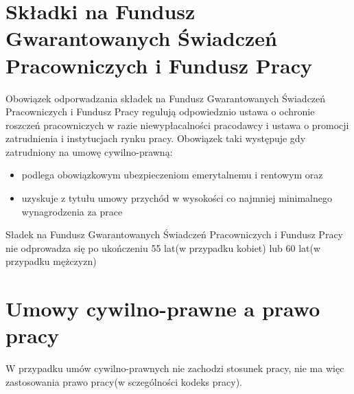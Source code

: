 
\section{Składki na Fundusz Gwarantowanych Świadczeń Pracowniczych i Fundusz Pracy}
Obowiązek odporwadzania składek na Fundusz Gwarantowanych Świadczeń Pracowniczych i Fundusz Pracy regulują odpowiedznio ustawa o ochronie roszczeń pracowniczych w razie niewypłacalności pracodawcy\cite{TODO} i ustawa o promocji zatrudnienia i instytucjach rynku pracy. Obowiązek taki występuje gdy zatrudniony na umowę cywilno-prawną:
\begin{itemize}
	\item podlega obowiązkowym ubezpieczeniom emerytalnemu i rentowym oraz
	\item uzyskuje z tytułu umowy przychód w wysokości co najmniej minimalnego wynagrodzenia za prace
\end{itemize}
Sładek na Fundusz Gwarantowanych Świadczeń Pracowniczych i Fundusz Pracy nie odprowadza się po ukończeniu 55 lat(w przypadku kobiet) lub 60 lat(w przypadku mężczyzn)

\section[Umowy cywilno-prawne a prawo pracy][Umowy cywilno-prawne a prawo pracy]{Umowy cywilno-prawne a prawo pracy}
W przypadku umów cywilno-prawnych nie zachodzi stosunek pracy, nie ma więc zastosowania prawo pracy(w sczególności kodeks pracy).

